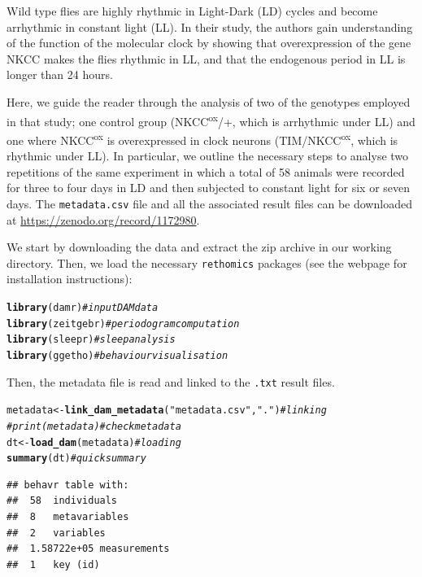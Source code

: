 \documentclass[10pt,letterpaper]{article}\usepackage[]{graphicx}\usepackage[]{color}
\makeatletter
\newcommand{\hlstr}[1]{\textcolor[rgb]{0.192,0.494,0.8}{#1}}%
\newcommand{\hlcom}[1]{\textcolor[rgb]{0.678,0.584,0.686}{\textit{#1}}}%
\newcommand{\hlstd}[1]{\textcolor[rgb]{0.345,0.345,0.345}{#1}}%
\newcommand{\hlkwb}[1]{\textcolor[rgb]{0.69,0.353,0.396}{#1}}%
\newcommand{\hlkwd}[1]{\textcolor[rgb]{0.737,0.353,0.396}{\textbf{#1}}}%
\newenvironment{kframe}{%
 \def\at@end@of@kframe{}%
 \ifinner\ifhmode%
  \def\at@end@of@kframe{\end{minipage}}%
  \begin{minipage}{\columnwidth}%
 \fi\fi%
 \def\FrameCommand##1{\hskip\@totalleftmargin \hskip-\fboxsep
 \colorbox{shadecolor}{##1}\hskip-\fboxsep
     \hskip-\linewidth \hskip-\@totalleftmargin \hskip\columnwidth}%
 \MakeFramed {\advance\hsize-\width
   \@totalleftmargin\z@ \linewidth\hsize
   \@setminipage}}%
 {\par\unskip\endMakeFramed%
 \at@end@of@kframe}
\newenvironment{knitrout}{}{} %
\makeatother
\begin{document}
Wild type flies are highly rhythmic in Light-Dark (LD) cycles and become arrhythmic in constant light (LL).
In their study, the authors gain understanding of the function of the molecular clock by showing that overexpression of the gene NKCC makes the flies rhythmic in LL,
and that the endogenous period in LL is longer than 24 hours.

Here, we guide the reader through the analysis of two of the genotypes employed in that study;
one control group (NKCC\textsuperscript{ox}/+, which is arrhythmic under LL) and one where NKCC\textsuperscript{ox} is overexpressed in clock neurons (TIM/NKCC\textsuperscript{ox}, which is rhythmic under LL).
In particular, we outline the necessary steps to analyse two repetitions of the same experiment in which a total of 58 animals were recorded for three to four days in LD and then subjected to constant light for six or seven days.
The \texttt{metadata.csv} file and all the associated result files can be downloaded at \href{https://zenodo.org/record/1172980}{https://zenodo.org/record/1172980}.

We start by downloading the data and extract the zip archive in our working directory.
Then, we load the necessary \texttt{rethomics} packages (see the webpage for installation instructions):

\begin{knitrout}
\color{fgcolor}\begin{kframe}
\begin{alltt}
\hlkwd{library}\hlstd{(damr)}      \hlcom{# input DAM data}
\hlkwd{library}\hlstd{(zeitgebr)}  \hlcom{# periodogram computation}
\hlkwd{library}\hlstd{(sleepr)}    \hlcom{# sleep analysis}
\hlkwd{library}\hlstd{(ggetho)}    \hlcom{# behaviour visualisation}
\end{alltt}
\end{kframe}
\end{knitrout}

Then, the metadata file is read and linked to the \texttt{.txt} result files.

\begin{knitrout}
\color{fgcolor}\begin{kframe}
\begin{alltt}
\hlstd{metadata} \hlkwb{<-} \hlkwd{link_dam_metadata}\hlstd{(}\hlstr{"metadata.csv"}\hlstd{,} \hlstr{"."}\hlstd{)}   \hlcom{# linking}
\hlcom{# print(metadata)                                    # check metadata}
\hlstd{dt} \hlkwb{<-} \hlkwd{load_dam}\hlstd{(metadata)}                             \hlcom{# loading}
\hlkwd{summary}\hlstd{(dt)}                                          \hlcom{# quick summary}
\end{alltt}
\begin{verbatim}
## behavr table with:
##  58	individuals
##  8	metavariables
##  2	variables
##  1.58722e+05	measurements
##  1	key (id)
\end{verbatim}
\end{kframe}
\end{knitrout}
\end{document}
